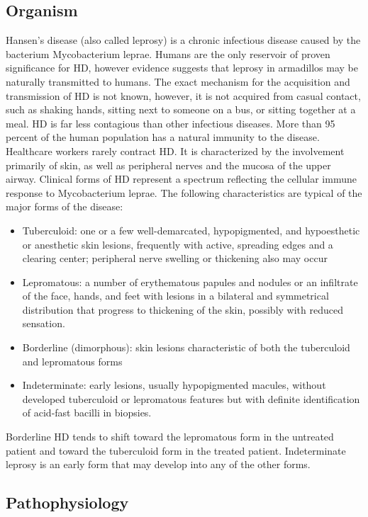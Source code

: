 \documentclass{article}
\begin{document}
\subsection{Organism}
Hansen’s disease (also called leprosy) is a chronic infectious disease caused by the bacterium Mycobacterium leprae.  Humans are the only reservoir of proven significance for HD, however evidence suggests that leprosy in armadillos may be naturally transmitted to humans. The exact mechanism for the acquisition and transmission of HD is not known, however, it is not acquired from casual contact, such as shaking hands, sitting next to someone on a bus, or sitting together at a meal. HD is far less contagious than other infectious diseases. More than 95 percent of the human population has a natural immunity to the disease. Healthcare workers rarely contract HD. It is  characterized by the involvement primarily of skin, as well as peripheral nerves and the mucosa of the upper airway. Clinical forms of HD represent a spectrum reflecting the cellular immune response to Mycobacterium leprae. The following characteristics are typical of the major forms of the disease:
	\begin{itemize}
		\item Tuberculoid: one or a few well-demarcated, hypopigmented, and hypoesthetic or anesthetic skin lesions, frequently with active, spreading edges and a clearing center; peripheral nerve swelling or thickening also may occur
		\item Lepromatous: a number of erythematous papules and nodules or an infiltrate of the face, hands, and feet with lesions in a bilateral and symmetrical distribution that progress to thickening of the skin, possibly with reduced sensation.
		\item Borderline (dimorphous): skin lesions characteristic of both the tuberculoid and lepromatous forms
		\item Indeterminate: early lesions, usually hypopigmented macules, without developed tuberculoid or lepromatous features but with definite identification of acid-fast bacilli in biopsies.
	\end{itemize}
Borderline HD tends to shift toward the lepromatous form in the untreated patient and toward the tuberculoid form in the treated patient. Indeterminate leprosy is an early form that may develop into any of the other forms.
\subsection{Pathophysiology}
\end{document}
